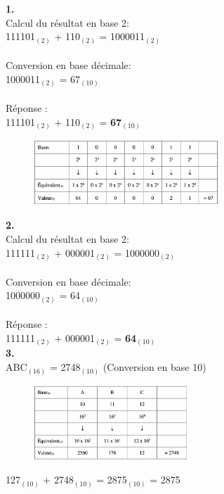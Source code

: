 \begin{Exercice}[20 minutes]
    \textbf{1.}\\
    Calcul du résultat en base 2:\\
    111101$_{(2)}$ + 110$_{(2)}$ = 1000011$_{(2)}$\\\\
    Conversion en base décimale:\\
    1000011$_{(2)}$ = 67$_{(10)}$\\\\
    Réponse :\\
    111101$_{(2)}$ + 110$_{(2)}$ = \textbf{67$_{(10)}$}
    
    \begin{figure}[h]
        \includegraphics[width=0.62\textwidth]{img/6.1.png}
    \end{figure}

    \textbf{2.}\\
    Calcul du résultat en base 2:\\
    111111$_{(2)}$ + 000001$_{(2)}$ = 1000000$_{(2)}$\\\\
    Conversion en base décimale:\\
    1000000$_{(2)}$ = 64$_{(10)}$\\\\
    Réponse :\\
    111111$_{(2)}$ + 000001$_{(2)}$ = \textbf{64$_{(10)}$}\\


\newpage
    \textbf{3.}\\
    ABC$_{(16)}$ = 2748$_{(10)}$ (Conversion en base 10)\\
    \begin{figure}[h]
        \includegraphics[width=0.52\textwidth]{img/6.3.1.png}
    \end{figure}  
    
    127$_{(10)}$ + 2748$_{(10)}$ = 2875$_{(10)}$ = 2875\\


\end{Exercice}
